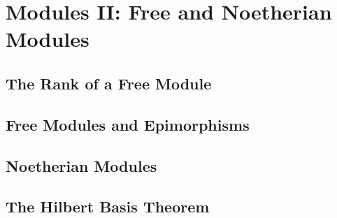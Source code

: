 \chapter{Modules II: Free and Noetherian Modules}
\section{The Rank of a Free Module}
\section{Free Modules and Epimorphisms}
\section{Noetherian Modules}
\section{The Hilbert Basis Theorem}
